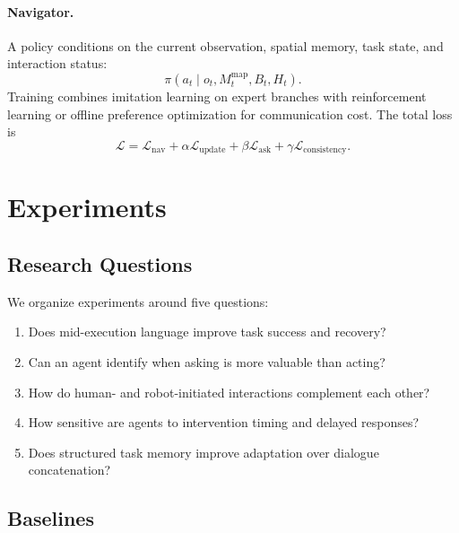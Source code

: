 \documentclass[10pt]{article}
\begin{document}
\paragraph{Navigator.}
A policy conditions on the current observation, spatial memory, task state,
and interaction status:
\begin{equation}
  \pi(a_t\mid o_t,M_t^{\mathrm{map}},B_t,H_t).
\end{equation}
Training combines imitation learning on expert branches with reinforcement
learning or offline preference optimization for communication cost.
The total loss is
\begin{equation}
  \mathcal{L}=\mathcal{L}_{\mathrm{nav}}
  +\alpha\mathcal{L}_{\mathrm{update}}
  +\beta\mathcal{L}_{\mathrm{ask}}
  +\gamma\mathcal{L}_{\mathrm{consistency}}.
\end{equation}

\section{Experiments}
\label{sec:experiments}

\subsection{Research Questions}

We organize experiments around five questions:
\begin{enumerate}[leftmargin=1.6em]
  \item Does mid-execution language improve task success and recovery?
  \item Can an agent identify when asking is more valuable than acting?
  \item How do human- and robot-initiated interactions complement each other?
  \item How sensitive are agents to intervention timing and delayed responses?
  \item Does structured task memory improve adaptation over dialogue
  concatenation?
\end{enumerate}

\subsection{Baselines}
\end{document}
